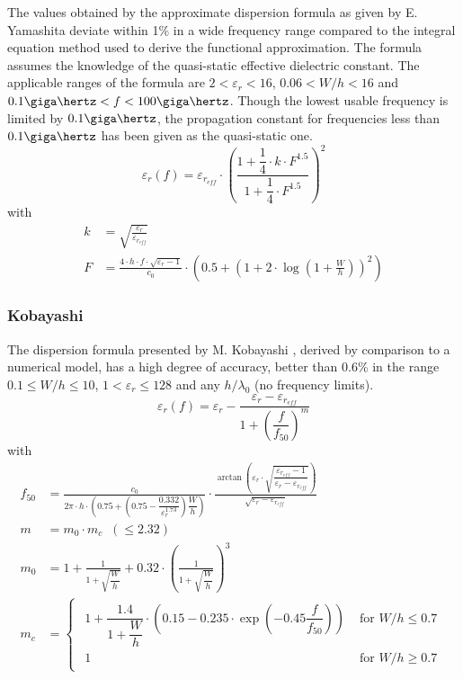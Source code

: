 \documentclass[10pt]{report}
\begin{document}
The values obtained by the approximate dispersion formula as given by
E. Yamashita \cite{Yamashita} deviate within 1\% in a wide frequency
range compared to the integral equation method used to derive the
functional approximation.  The formula assumes the knowledge of the
quasi-static effective dielectric constant.  The applicable ranges of
the formula are $2 < \varepsilon_r < 16$, $0.06 < W/h < 16$ and
$0.1\giga\hertz < f < 100\giga\hertz$.  Though the lowest usable
frequency is limited by $0.1\giga\hertz$, the propagation constant for
frequencies less than $0.1\giga\hertz$ has been given as the
quasi-static one.
\begin{equation}
\varepsilon_{r}(f) = \varepsilon_{r_{eff}}\cdot \left(\frac{1 + \dfrac{1}{4}\cdot k\cdot F^{1.5}}{1 + \dfrac{1}{4}\cdot F^{1.5}}\right)^{2}
\end{equation}
with
\begin{align}
k &= \sqrt{\frac{\varepsilon_{r}}{\varepsilon_{r_{eff}}}}\\
F &= \frac{4\cdot h\cdot f\cdot \sqrt{\varepsilon_{r} - 1}}{c_{0}} \cdot \left(0.5 + \left(1 + 2 \cdot \log\left(1 + \frac{W}{h}\right)\right)^{2}\right)
\end{align}

\subsubsection{Kobayashi}

The dispersion formula presented by M. Kobayashi \cite{Kobayashi},
derived by comparison to a numerical model, has a high degree of
accuracy, better than 0.6\% in the range $0.1 \le W/h \le 10$, $1 <
\varepsilon_r \le 128$ and any $h/\lambda_0$ (no frequency limits).
\begin{equation}
\varepsilon_{r}(f) = \varepsilon_{r} - \frac{\varepsilon_{r} - \varepsilon_{r_{eff}}}{1 + \left(\dfrac{f}{f_{50}}\right)^{m}}
\end{equation}
with
\begin{align}
f_{50} &= \frac{c_{0}}{2\pi\cdot h \cdot\left(0.75 + \left(0.75 - \dfrac{0.332}{\varepsilon_{r}^{1.73}}\right)\dfrac{W}{h}\right)} \cdot \frac{\arctan\left(\varepsilon_{r}\cdot\sqrt{\dfrac{\varepsilon_{r_{eff}} - 1}{\varepsilon_{r} - \varepsilon_{r_{eff}}}}\right)}{\sqrt{\varepsilon_{r} - \varepsilon_{r_{eff}}}}\\
m &= m_{0}\cdot m_{c} \;\; (\le 2.32)\\
m_{0} &= 1 + \frac{1}{1 + \sqrt{\dfrac{W}{h}}} + 0.32\cdot\left(\frac{1}{1 + \sqrt{\dfrac{W}{h}}}\right)^{3}\\
m_{c} &=
\begin{cases}
\begin{array}{ll}
1 + \dfrac{1.4}{1 + \dfrac{W}{h}}\cdot\left(0.15 - 0.235\cdot\exp\left(-0.45\dfrac{f}{f_{50}}\right)\right) & \textrm{ for } W / h \le 0.7\\
1 & \textrm{ for } W / h \ge 0.7
\end{array}
\end{cases}
\end{align}
\end{document}
